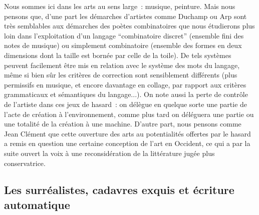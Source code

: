 \documentclass{article}
\begin{document}
			Nous sommes ici dans les arts au sens large : musique, peinture. Mais nous pensons que, d'une part les démarches d'artistes comme Duchamp ou Arp sont très semblables aux démarches des poètes combinatoires que nous étudierons plus loin dans l'exploitation d'un langage ``combinatoire discret'' (ensemble fini des notes de musique) ou simplement combinatoire (ensemble des formes en deux dimensions dont la taille est bornée par celle de la toile). De tels systèmes peuvent facilement être mis en relation avec le système des mots du langage, même si bien sûr les critères de correction sont sensiblement différents (plus permissifs en musique, et encore davantage en collage, par rapport aux critères grammaticaux et sémantiques du langage...). On note aussi la perte de contrôle de l'artiste dans ces jeux de hasard : on délègue en quelque sorte une partie de l'acte de création à l'environnement, comme plus tard on déléguera une partie ou une totalité de la création à une machine. D'autre part, nous pensons comme Jean Clément que cette ouverture des arts au potentialités offertes par le hasard a remis en question une certaine conception de l'art en Occident, ce qui a par la suite ouvert la voix à une reconsidération de la littérature jugée plus conservatrice.
		\subsection{Les surréalistes, cadavres exquis et écriture automatique}
\end{document}
